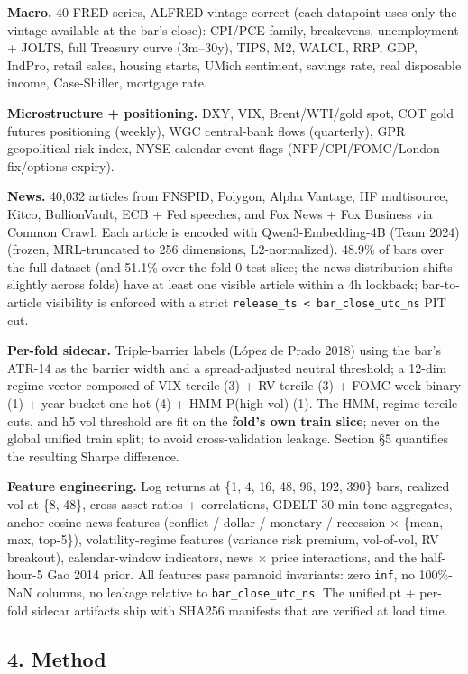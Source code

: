 \documentclass[
]{article}
\begin{document}
\textbf{Macro.} 40 FRED series, ALFRED vintage-correct (each datapoint
uses only the vintage available at the bar's close): CPI/PCE family,
breakevens, unemployment + JOLTS, full Treasury curve (3m--30y), TIPS,
M2, WALCL, RRP, GDP, IndPro, retail sales, housing starts, UMich
sentiment, savings rate, real disposable income, Case-Shiller, mortgage
rate.

\textbf{Microstructure + positioning.} DXY, VIX, Brent/WTI/gold spot,
COT gold futures positioning (weekly), WGC central-bank flows
(quarterly), GPR geopolitical risk index, NYSE calendar event flags
(NFP/CPI/FOMC/London-fix/options-expiry).

\textbf{News.} 40,032 articles from FNSPID, Polygon, Alpha Vantage, HF
multisource, Kitco, BullionVault, ECB + Fed speeches, and Fox News + Fox
Business via Common Crawl. Each article is encoded with
Qwen3-Embedding-4B (Team 2024) (frozen, MRL-truncated to 256 dimensions,
L2-normalized). 48.9\% of bars over the full dataset (and 51.1\% over
the fold-0 test slice; the news distribution shifts slightly across
folds) have at least one visible article within a 4h lookback;
bar-to-article visibility is enforced with a strict
\texttt{release\_ts\ \textless{}\ bar\_close\_utc\_ns} PIT cut.

\textbf{Per-fold sidecar.} Triple-barrier labels (López de Prado 2018)
using the bar's ATR-14 as the barrier width and a spread-adjusted
neutral threshold; a 12-dim regime vector composed of VIX tercile (3) +
RV tercile (3) + FOMC-week binary (1) + year-bucket one-hot (4) + HMM
P(high-vol) (1). The HMM, regime tercile cuts, and h5 vol threshold are
fit on the \textbf{fold's own train slice}; never on the global unified
train split; to avoid cross-validation leakage. Section §5 quantifies
the resulting Sharpe difference.

\textbf{Feature engineering.} Log returns at \{1, 4, 16, 48, 96, 192,
390\} bars, realized vol at \{8, 48\}, cross-asset ratios +
correlations, GDELT 30-min tone aggregates, anchor-cosine news features
(conflict / dollar / monetary / recession × \{mean, max, top-5\}),
volatility-regime features (variance risk premium, vol-of-vol, RV
breakout), calendar-window indicators, news × price interactions, and
the half-hour-5 Gao 2014 prior. All features pass paranoid invariants:
zero \texttt{inf}, no 100\%-NaN columns, no leakage relative to
\texttt{bar\_close\_utc\_ns}. The unified.pt + per-fold sidecar
artifacts ship with SHA256 manifests that are verified at load time.

\subsection{4. Method}\label{method}
\end{document}
